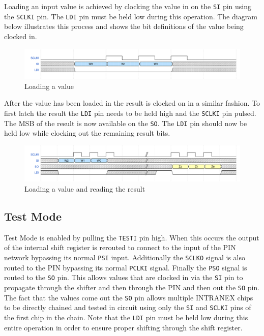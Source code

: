 \documentclass{article}
\begin{document}
Loading an input value is achieved by clocking the value in on the \texttt{SI}
pin using the \texttt{SCLKI} pin. The \texttt{LDI} pin must be held low during
this operation. The diagram below illustrates this process and shows the bit
definitions of the value being clocked in.

\begin{figure}[H]
    \centering
    \includegraphics[width=\linewidth]{../waveforms/shift_load.png}
    \caption{Loading a value}
\end{figure}

After the value has been loaded in the result is clocked on in a similar
fashion. To first latch the result the \texttt{LDI} pin needs to be held high
and the \texttt{SCLKI} pin pulsed. The MSB of the result is now available on
the \texttt{SO}. The \texttt{LDI} pin should now be held low while clocking out
the remaining result bits.

\begin{figure}[H]
    \centering
    \includegraphics[width=\linewidth]{../waveforms/shift_load_read.png}
    \caption{Loading a value and reading the result}
\end{figure}

\subsection{Test Mode}

Test Mode is enabled by pulling the \texttt{TESTI} pin high. When this occurs
the output of the internal shift register is rerouted to connect to the input
of the PIN network bypassing its normal \texttt{PSI} input.  Additionally the
\texttt{SCLKO} signal is also routed to the PIN bypassing its normal
\texttt{PCLKI} signal. Finally the \texttt{PSO} signal is routed to the
\texttt{SO} pin. This allows values that are clocked in via the \texttt{SI} pin
to propagate through the shifter and then through the PIN and then out the
\texttt{SO} pin. The fact that the values come out the \texttt{SO} pin allows
multiple INTRANEX chips to be directly chained and tested in circuit using only the
\texttt{SI} and \texttt{SCLKI} pins of the first chip in the chain. Note that
the \texttt{LDI} pin must be held low during this entire operation in order to
ensure proper shifting through the shift register.
\end{document}
